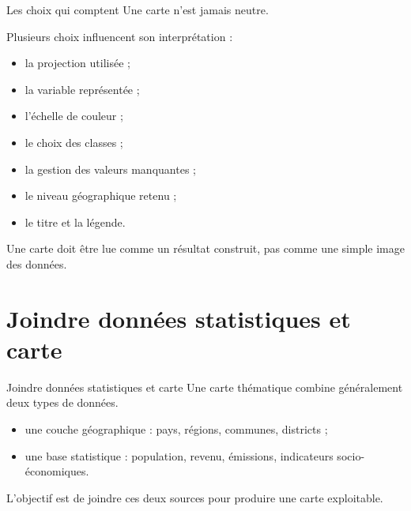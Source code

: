 \documentclass[
  10pt,
  ignorenonframetext,
]{beamer}
\begin{document}
\begin{frame}{Les choix qui comptent}
\label{les-choix-qui-comptent}
Une carte n'est jamais neutre.

Plusieurs choix influencent son interprétation :

\begin{itemize}
  \item la projection utilisée ;
  \item la variable représentée ;
  \item l’échelle de couleur ;
  \item le choix des classes ;
  \item la gestion des valeurs manquantes ;
  \item le niveau géographique retenu ;
  \item le titre et la légende.
\end{itemize}

Une carte doit être lue comme un résultat construit, pas comme une
simple image des données.
\end{frame}

\section{Joindre données statistiques et
carte}\label{joindre-donnuxe9es-statistiques-et-carte}

\begin{frame}{Joindre données statistiques et carte}
\label{joindre-donnuxe9es-statistiques-et-carte-1}
Une carte thématique combine généralement deux types de données.

\begin{itemize}
  \item une couche géographique : pays, régions, communes, districts ;
  \item une base statistique : population, revenu, émissions, indicateurs socio-économiques.
\end{itemize}

L'objectif est de joindre ces deux sources pour produire une carte
exploitable.
\end{frame}
\end{document}

